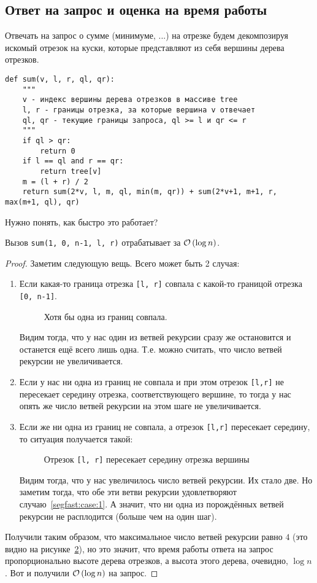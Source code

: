 \subsection{Ответ на запрос и оценка на время работы}
Отвечать на запрос о сумме (минимуме, ...) на отрезке будем декомпозируя искомый отрезок на куски, которые представляют из себя вершины дерева отрезков.
\begin{verbatim}
def sum(v, l, r, ql, qr):
    """
    v - индекс вершины дерева отрезков в массиве tree
    l, r - границы отрезка, за которые вершина v отвечает
    ql, qr - текущие границы запроса, ql >= l и qr <= r
    """
    if ql > qr:
        return 0
    if l == ql and r == qr:
        return tree[v]
    m = (l + r) / 2
    return sum(2*v, l, m, ql, min(m, qr)) + sum(2*v+1, m+1, r, max(m+1, ql), qr)
\end{verbatim}
Нужно понять, как быстро это работает?
\begin{lem}
Вызов \texttt{sum(1, 0, n-1, l, r)} отрабатывает за $\mathcal{O}\left(\log{n}\right)$.
\end{lem} 
\begin{proof}
Заметим следующую вещь. Всего может быть 2 случая:
\begin{enumerate}[label=\arabic*.]
\item Если какая-то граница отрезка \texttt{[l, r]} совпала с какой-то границой отрезка \texttt{[0, n-1]}.
\begin{figure}[ht!]
\centering
\def\svgwidth{0.4\columnwidth} 

\caption{Хотя бы одна из границ совпала.}
\label{fig:rec_seg_1}
\end{figure}
Видим тогда, что у нас один из ветвей рекурсии сразу же остановится и останется ещё всего лишь одна. Т.е. можно считать, что число ветвей рекурсии не увеличивается.
\item \label{segfast:case:1} Если у нас ни одна из границ не совпала и при этом отрезок \texttt{[l,r]} не пересекает середину отрезка, соответствующего вершине, то тогда у нас опять же число ветвей рекурсии на этом шаге не увеличивается.
\item Если же ни одна из границ не совпала, а отрезок \texttt{[l,r]} пересекает середину, то ситуация получается такой:
\begin{figure}[ht!]
\centering
\def\svgwidth{0.4\columnwidth} 

\caption{Отрезок \texttt{[l, r]} пересекает середину отрезка вершины}
\label{fig:rec_seg_2}
\end{figure}
Видим тогда, что у нас увеличилось число ветвей рекурсии. Их стало две. Но заметим тогда, что обе эти ветви рекурсии удовлетворяют случаю~\ref{segfast:case:1}. А значит, что ни одна из порождённых ветвей рекурсии не расплодится (больше чем на один шаг).
\end{enumerate}
Получили таким образом, что максимальное число ветвей рекурсии равно $4$ (это видно на рисунке~\ref{fig:rec_seg_2}), но это значит, что время работы ответа на запрос пропорционально высоте дерева отрезков, а высота этого дерева, очевидно, $\log{n}$. Вот и получили $\mathcal{O}\left(\log{n}\right)$ на запрос.
\end{proof}
